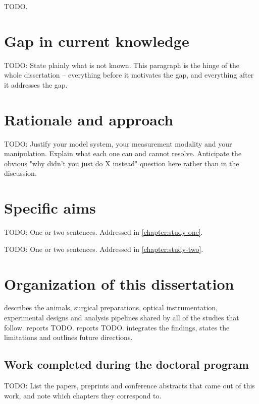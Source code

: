 			TODO.

	\section{Gap in current knowledge}\label{section:introduction:gap}

		TODO: State plainly what is not known. This paragraph is the hinge of
		the whole dissertation -- everything before it motivates the gap, and
		everything after it addresses the gap.

	\section{Rationale and approach}\label{section:introduction:rationale}

		TODO: Justify your model system, your measurement modality and your
		manipulation. Explain what each one can and cannot resolve. Anticipate
		the obvious "why didn't you just do X instead" question here rather
		than in the discussion.

	\section{Specific aims}\label{section:introduction:aims}

		\begin{description}[style=unboxed, leftmargin=0em]

			\item[Aim 1.]
				TODO: One or two sentences. Addressed in
				\cref{chapter:study-one}.

			\item[Aim 2.]
				TODO: One or two sentences. Addressed in
				\cref{chapter:study-two}.

		\end{description}

	\section{Organization of this dissertation}\label{section:introduction:structure}

		 describes the animals, surgical preparations,
		optical instrumentation, experimental designs and analysis pipelines
		shared by all of the studies that follow.
		 reports TODO.
		 reports TODO.
		 integrates the findings, states the
		limitations and outlines future directions.

	\subsection*{Work completed during the doctoral program}

		TODO: List the papers, preprints and conference abstracts that came
		out of this work, and note which chapters they correspond to.
